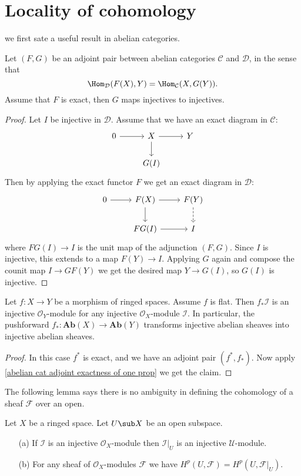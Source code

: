 \section{Locality of cohomology}
we first sate a useful result in abelian categories.
\begin{theorem}\label{abelian cat adjoint exactness of one prop}
Let $(F,G)$ be an adjoint pair between abelian categories $\mathcal{C}$ and $\mathcal{D}$, in the sense that
\[\Hom_{\mathcal{D}}(F(X),Y)=\Hom_{\mathcal{C}}(X,G(Y)).\]
Assume that $F$ is exact, then $G$ maps injectives to injectives.
\end{theorem}
\begin{proof}
Let $I$ be injective in $\mathcal{D}$. Assume that we have an exact diagram in $\mathcal{C}$:
\[\begin{tikzcd}
0\ar[r]&X\ar[r]\ar[d]&Y\\
&G(I)
\end{tikzcd}\]
Then by applying the exact functor $F$ we get an exact diagram in $\mathcal{D}$:
\[\begin{tikzcd}
0\ar[r]&F(X)\ar[r]\ar[d]&F(Y)\ar[d,dashed]\\
&FG(I)\ar[r]&I
\end{tikzcd}\]
where $FG(I)\to I$ is the unit map of the adjunction $(F,G)$. Since $I$ is injective, this extends to a map $F(Y)\to I$. Applying $G$ again and compose the counit map $I\to GF(Y)$ we get the desired map $Y\to G(I)$, so $G(I)$ is injective.
\end{proof}
\begin{proposition}
Let $f:X\to Y$ be a morphism of ringed spaces. Assume $f$ is flat. Then $f_*\mathscr{I}$ is an injective $\mathscr{O}_Y$-module for any injective $\mathscr{O}_X$-module $\mathscr{I}$. In particular, the pushforward $f_*:\mathbf{Ab}(X)\to\mathbf{Ab}(Y)$ transforms injective abelian sheaves into injective abelian sheaves.
\end{proposition}
\begin{proof}
In this case $f^*$ is exact, and we have an adjoint pair $(f^*,f_*)$. Now apply \cref{abelian cat adjoint exactness of one prop} we get the claim.
\end{proof}
The following lemma says there is no ambiguity in defining the cohomology of a sheaf $\mathscr{F}$ over an open.
\begin{lemma}
Let $X$ be a ringed space. Let $U\sub X$ be an open subspace.
\begin{itemize}
\item[(a)] If $\mathscr{I}$ is an injective $\mathcal{O}_X$-module then $\mathscr{I}|_U$ is an injective $\mathcal{U}$-module.
\item[(b)] For any sheaf of $\mathcal{O}_X$-modules $\mathscr{F}$ we have $H^p(U,\mathscr{F})=H^p(U,\mathscr{F}|_U)$.
\end{itemize}
\end{lemma}
